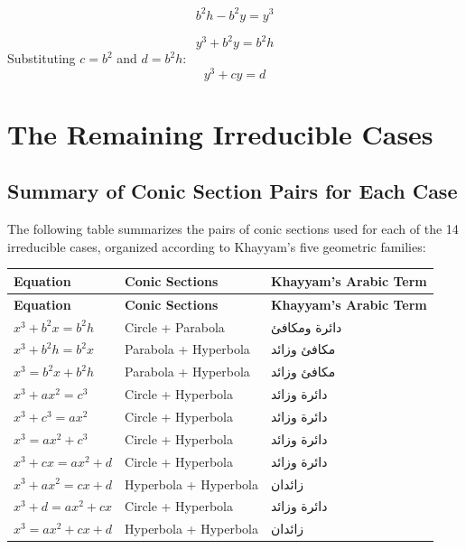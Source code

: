 \[b^2 h - b^2 y = y^3\]

\[y^3 + b^2 y = b^2 h\]
Substituting $c = b^2$ and $d = b^2 h$:
\[
\boxed{y^3 + cy = d}\]

\clearpage

\section{The Remaining Irreducible Cases}

\label{sec:remaining}


\subsection{Summary of Conic Section Pairs for Each Case}

\label{subsec:summary}
The following table summarizes the pairs of conic sections used for each of the 14 irreducible cases, organized according to Khayyam's five geometric families:

\begin{center}

\renewcommand{\arraystretch}{1.4}

\begin{longtable}
{p{5.5cm}p{3.5cm}p{4cm}}\toprule
\textbf{Equation} & 
\textbf{Conic Sections} & 
\textbf{Khayyam's Arabic Term} \\
\midrule\endfirsthead\toprule
\textbf{Equation} & 
\textbf{Conic Sections} & 
\textbf{Khayyam's Arabic Term} \\
\midrule\endhead\bottomrule\endfoot$x^3 + b^2 x = b^2 h$ & Circle + Parabola & 
\textarabic{دائرة ومكافئ} \\
$x^3 + b^2 h = b^2 x$ & Parabola + Hyperbola & 
\textarabic{مكافئ وزائد} \\
$x^3 = b^2 x + b^2 h$ & Parabola + Hyperbola & 
\textarabic{مكافئ وزائد} \\
$x^3 + ax^2 = c^3$ & Circle + Hyperbola & 
\textarabic{دائرة وزائد} \\
$x^3 + c^3 = ax^2$ & Circle + Hyperbola & 
\textarabic{دائرة وزائد} \\
$x^3 = ax^2 + c^3$ & Circle + Hyperbola & 
\textarabic{دائرة وزائد} \\
$x^3 + cx = ax^2 + d$ & Circle + Hyperbola & 
\textarabic{دائرة وزائد} \\
$x^3 + ax^2 = cx + d$ & Hyperbola + Hyperbola & 
\textarabic{زائدان} \\
$x^3 + d = ax^2 + cx$ & Circle + Hyperbola & 
\textarabic{دائرة وزائد} \\
$x^3 = ax^2 + cx + d$ & Hyperbola + Hyperbola & 
\textarabic{زائدان} \\
\bottomrule

\end{longtable}

\end{center}

